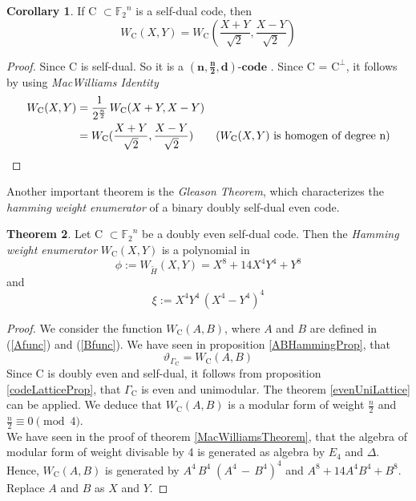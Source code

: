 \documentclass[12pt]{article}
\theoremstyle{definition}
\newtheorem{theorem}{Theorem}[section]
\newtheorem{collary}[theorem]{Corollary}
\numberwithin{equation}{theorem}
\numberwithin{figure}{theorem}
\newcommand{\Ftwo}{\ensuremath{\mathbb{F}_2}}
\newcommand{\simpleCodes}{\ensuremath{\mathrm{C}}}
\newcommand{\buildVertical}[1]{\ensuremath{#1^{\bot}}}
\newcommand{\buildLattice}[1]{\ensuremath{\Gamma_{#1}}}
\newcommand{\weightEnumerator}[3]{\ensuremath{W_{#1}(#2,#3)}}
\newcommand{\thetaFunction}[1]{\ensuremath{\vartheta_{#1}}}
\newcommand{\linearCode}[3]{\ensuremath{\bm{(#1,#2,#3)\mbox{-}code}}}
\newcommand{\polyAB}[2]{\ensuremath{#1^4#2^4\,(#1^4 - #2^4)^4}}
\newcommand{\twoFourDegreeAB}{\ensuremath{A^4\,B^4\;(A^4 \,-\, B^4)^4}}
\begin{document}
\begin{collary}\label{macWilliamsSelfDualCoroll}
If {\simpleCodes} $\subset \Ftwo^n$ is a self-dual code, then 
\[
	\weightEnumerator{\simpleCodes}{X}{Y} = \weightEnumerator{\simpleCodes}{\frac{X + Y}{\sqrt{2}}}{\frac{X - Y}{\sqrt{2}}}
\]
\end{collary}
\begin{proof}
Since {\simpleCodes} is self-dual. So it is a {\linearCode{n}{\frac{n}{2}}{d}} . Since {\simpleCodes} = {\buildVertical{\simpleCodes}}, it follows by using \emph{MacWilliams Identity}
\begin{align*}
	\weightEnumerator{\simpleCodes}{X}{Y} &= \frac{1}{2^{\frac{n}{2}}} \, \weightEnumerator{\simpleCodes}{X+Y}{X-Y} \\
	&= \weightEnumerator{\simpleCodes}{\frac{X+Y}{\sqrt{2}}}{\frac{X-Y}{\sqrt{2}}} \tag{\weightEnumerator{\simpleCodes}{X}{Y} is homogen of degree n}
\end{align*}
\end{proof}
Another important theorem is the \emph{Gleason Theorem}, which characterizes the \emph{hamming weight enumerator} of a binary doubly self-dual even code.
\begin{theorem}\label{GleasonTheorem}
Let {\simpleCodes} $\subset \Ftwo^n$ be a doubly even self-dual code. Then the \emph{Hamming weight enumerator} {\weightEnumerator{\simpleCodes}{X}{Y}} is a polynomial in
\[
	\phi := \weightEnumerator{\widetilde{H}}{X}{Y} = X^8 + 14X^4Y^4 + Y^8
\]  
and
\[
	\xi := \polyAB{X}{Y}
\]
\end{theorem}
\begin{proof}
We consider the function \weightEnumerator{\simpleCodes}{A}{B}, where $A$ and $B$ are defined in (\ref{Afunc}) and (\ref{Bfunc}). We have seen in proposition \ref{ABHammingProp}, that 
\[
	\thetaFunction{\buildLattice{\simpleCodes}} = \weightEnumerator{\simpleCodes}{A}{B}
\]
Since {\simpleCodes} is doubly even and self-dual, it follows from proposition \ref{codeLatticeProp}, that $\buildLattice{\simpleCodes}$ is even and unimodular. The theorem \ref{evenUniLattice} can be applied. We deduce that {\weightEnumerator{\simpleCodes}{A}{B}} is a modular form of weight $\frac{n}{2}$ and $\frac{n}{2} \equiv 0 \pmod 4$.\\
We have seen in the proof of theorem \ref{MacWilliamsTheorem}, that the algebra of modular form of weight divisable by 4 is generated as algebra by $E_4$ and $\Delta$. Hence, {\weightEnumerator{\simpleCodes}{A}{B}} is generated by $\twoFourDegreeAB$ and $A^8 + 14A^4B^4 + B^8$. Replace $A$ and $B$ as $X$ and $Y$.
\end{proof}
\end{document}
